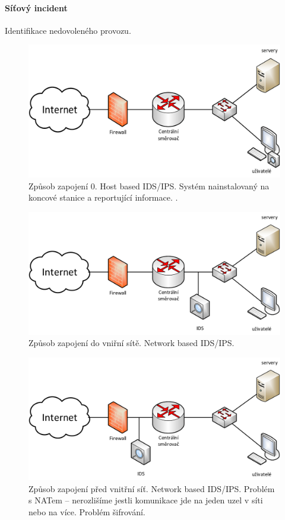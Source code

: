 \paragraph*{Síťový incident} Identifikace nedovoleného provozu.

\begin{figure}[H]
    \centering
    \includegraphics[width=0.75\linewidth]{zpusob_zapojeni_0.png}
    \caption{Způsob zapojení 0. Host based IDS/IPS. Systém nainstalovaný na koncové stanice a reportující informace. .}
\end{figure}

\begin{figure}[H]
    \centering
    \includegraphics[width=0.75\linewidth]{zpusob_zapojeni_1.png}
    \caption{Způsob zapojení do vniřní sítě. Network based IDS/IPS.}
\end{figure}

\begin{figure}[H]
    \centering
    \includegraphics[width=0.75\linewidth]{zpusob_zapojeni_2.png}
    \caption{Způsob zapojení před vnitřní síť. Network based IDS/IPS. Problém s NATem -- nerozlišíme jestli komunikace jde na jeden uzel v síti nebo na více. Problém šifrování.}
\end{figure}


